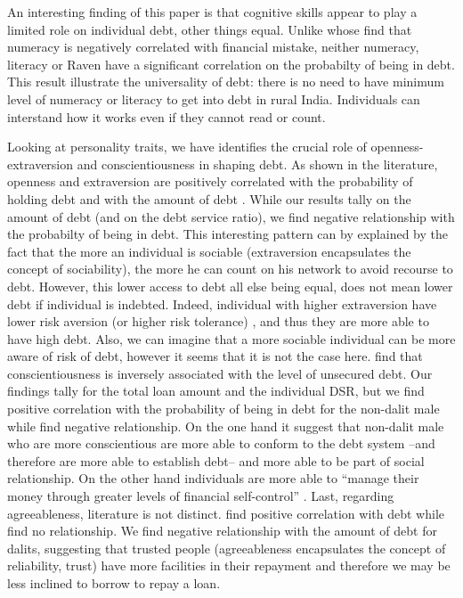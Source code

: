 \documentclass[a4paper, 11pt, onecolumn]{article}
\newcommand{\aebe}{all else being equal}
\newcommand{\ote}{other things equal}
\begin{document}
An interesting finding of this paper is that cognitive skills appear to play a limited role on individual debt, \ote.
Unlike \cite{Agarwal2013} whose find that numeracy is negatively correlated with financial mistake, neither numeracy, literacy or Raven have a significant correlation on the probabilty of being in debt.
This result illustrate the universality of debt: there is no need to have minimum level of numeracy or literacy to get into debt in rural India.
Individuals can interstand how it works even if they cannot read or count.

Looking at personality traits, we have identifies the crucial role of openness-extraversion and conscientiousness in shaping debt.
As shown in the literature, openness and extraversion are positively correlated with the probability of holding debt and with the amount of debt \citep{Brown2014}.
While our results tally on the amount of debt (and on the debt service ratio), we find negative relationship with the probabilty of being in debt.
This interesting pattern can by explained by the fact that the more an individual is sociable (extraversion encapsulates the concept of sociability), the more he can count on his network to avoid recourse to debt.
However, this lower access to debt \aebe, does not mean lower debt if individual is indebted.
Indeed, individual with higher extraversion have lower risk aversion (or higher risk tolerance) \citep{Pinjisakikool2017b}, and thus they are more able to have high debt.
Also, we can imagine that a more sociable individual can be more aware of risk of debt, however it seems that it is not the case here.
\cite{Brown2014, Donnelly2012} find that conscientiousness is inversely associated with the level of unsecured debt.
Our findings tally for the total loan amount and the individual DSR, but we find positive correlation with the probability of being in debt for the non-dalit male while \cite{Nyhus2001, Brown2014} find negative relationship.
On the one hand it suggest that non-dalit male who are more conscientious are more able to conform \citep{DeYoung2002} to the debt system --and therefore are more able to establish debt-- and more able to be part of social relationship.
On the other hand individuals are more able to ``manage their money through greater levels of financial self-control'' \citep{Brown2014}.
Last, regarding agreeableness, literature is not distinct.
\cite{Brown2014} find positive correlation with debt while \cite{Nyhus2001} find no relationship.
We find negative relationship with the amount of debt for dalits, suggesting that trusted people (agreeableness encapsulates the concept of reliability, trust) have more facilities in their repayment and therefore we may be less inclined to borrow to repay a loan. 
\end{document}
